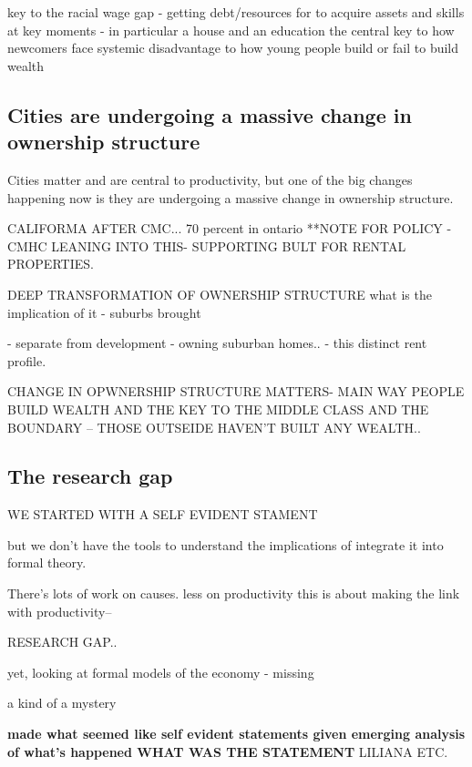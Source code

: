 key to the racial wage gap - getting debt/resources for to acquire assets and skills at key moments - in particular a house and an education the central
key to how newcomers face systemic disadvantage
to how young people build or fail to build wealth




\subsection{Cities are undergoing a massive change in ownership structure}

Cities matter and are central to productivity, but one of the big changes happening now is they are undergoing a massive change in ownership structure. 

CALIFORMA AFTER CMC... 
70 percent in ontario 
**NOTE FOR POLICY - CMHC LEANING INTO THIS- SUPPORTING BULT FOR RENTAL PROPERTIES. 

DEEP TRANSFORMATION OF OWNERSHIP STRUCTURE
what is the implication of it
- suburbs brought

- separate from development - owning suburban homes.. 
- this distinct rent profile.


CHANGE IN OPWNERSHIP STRUCTURE MATTERS- 
MAIN WAY PEOPLE BUILD WEALTH AND THE KEY TO THE MIDDLE CLASS
AND THE BOUNDARY -- THOSE OUTSEIDE HAVEN'T BUILT ANY WEALTH..

\subsection{The research gap}

WE STARTED WITH A SELF EVIDENT STAMENT

 but we don't have the tools to understand the implications of integrate it into formal theory.
 
 There's lots of work on causes.
 less on productivity 
 this is about making the link with productivity--

RESEARCH GAP..


yet, looking at formal models of the economy - missing

a kind of a mystery


\textbf{made what seemed like self evident statements given emerging analysis of what's happened WHAT WAS THE STATEMENT} LILIANA ETC.

